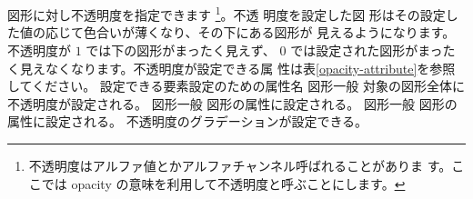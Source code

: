 \section{}
図形に対し不透明度を指定できます
\footnote{不透明度はアルファ値とかアルファチャンネル呼ばれることがありま
す。ここでは opacity の意味を利用して不透明度と呼ぶことにします。}。不透
明度を設定した図
形はその設定した値の応じて色合いが薄くなり、その下にある図形が
見えるようになります。不透明度が $1$ では下の図形がまったく見えず、
$0$ では設定された図形がまったく見えなくなります。不透明度が設定できる属
性は表\ref{opacity-attribute}を参照してください。
{{ 設定できる要素}{設定のための属性名}{}
{図形一般}{}
     {対象の図形全体に不透明度が設定される。}
{図形一般}{}
    {図形の属性に設定される。}
{図形一般}{}
    {図形の属性に設定される。}
{}{}
    {不透明度のグラデーションが設定できる。}}

\iffalse
不透明度 $0$ の部分の図形は見えませんが、存在はします。
図形をまったく見せなくする方法としては属性\Attrib{visibility}を
\AttribAVal{hidden}{}に設定する方法もあります。これについては
\ref{visibility-hidden}を参照してください。
「不透明度を $0$ する」と「属性\Attrib{visibility}を
\AttribAVal{hidden}{}に設定する」%
の違いはインターラクティブな\SVG を作成した場合に表れます。
\fi

